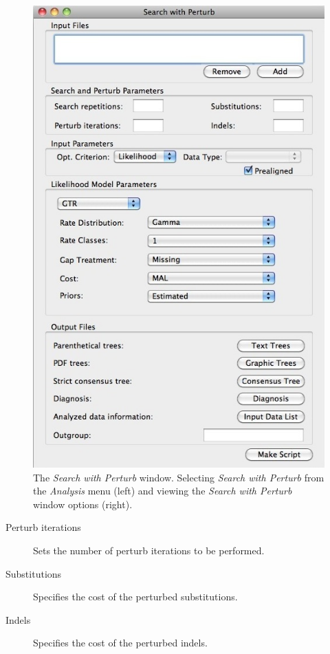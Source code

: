 {\begin{figure}
\begin{minipage}[c]{0.52\textwidth}
	   	\includegraphics[width=\textwidth]{doc/figures/searchwithperturb_window.jpg}
   	\end{minipage} 
\caption{The \emph{Search with Perturb} window. Selecting \emph{Search with Perturb} from the \emph{Analysis} 
menu (left) and viewing the \emph{Search with Perturb} window options (right).}
\label{fig:search_with_perturb_window}
\end{figure}

\begin{description}
    \item[Perturb iterations] Sets the number of perturb iterations to be performed.
    \item[Substitutions] Specifies the cost of the perturbed substitutions.
    \item[Indels] Specifies the cost of the perturbed indels.
\end{description}

}
